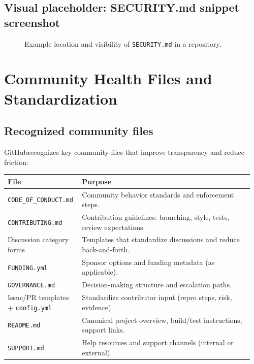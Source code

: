 \documentclass[11pt]{article}
\newcommand{\gh}{\textsf{GitHub}}
\begin{document}
\subsection{Visual placeholder: SECURITY.md snippet screenshot}
\begin{figure}[h!]
\centering
{}
\caption{Example location and visibility of \texttt{SECURITY.md} in a repository.}
\end{figure}

\section{Community Health Files and Standardization}

\subsection{Recognized community files}
\gh recognizes key community files that improve transparency and reduce friction:

\begin{longtable}{@{}p{0.28\linewidth}p{0.68\linewidth}@{}}
\toprule
\textbf{File} & \textbf{Purpose} \\
\midrule
\endhead

\texttt{CODE\_OF\_CONDUCT.md} & Community behavior standards and enforcement steps. \\
\texttt{CONTRIBUTING.md} & Contribution guidelines: branching, style, tests, review expectations. \\
Discussion category forms & Templates that standardize discussions and reduce back-and-forth. \\
\texttt{FUNDING.yml} & Sponsor options and funding metadata (as applicable). \\
\texttt{GOVERNANCE.md} & Decision-making structure and escalation paths. \\
Issue/PR templates + \texttt{config.yml} & Standardize contributor input (repro steps, risk, evidence). \\
\texttt{README.md} & Canonical project overview, build/test instructions, support links. \\
\texttt{SUPPORT.md} & Help resources and support channels (internal or external). \\
\bottomrule
\end{longtable}
\end{document}

